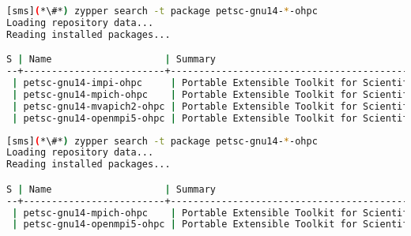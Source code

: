 \begin{lstlisting}[language=bash,keepspaces=true,keywords={}]
[sms](*\#*) zypper search -t package petsc-gnu14-*-ohpc
Loading repository data...
Reading installed packages...

S | Name                    | Summary
--+-------------------------+--------------------------------------------------------+--------
 | petsc-gnu14-impi-ohpc     | Portable Extensible Toolkit for Scientific Computation | package
 | petsc-gnu14-mpich-ohpc    | Portable Extensible Toolkit for Scientific Computation | package
 | petsc-gnu14-mvapich2-ohpc | Portable Extensible Toolkit for Scientific Computation | package
 | petsc-gnu14-openmpi5-ohpc | Portable Extensible Toolkit for Scientific Computation | package
\end{lstlisting}
\fi

\begin{lstlisting}[language=bash,keepspaces=true,keywords={}]
[sms](*\#*) zypper search -t package petsc-gnu14-*-ohpc
Loading repository data...
Reading installed packages...

S | Name                    | Summary
--+-------------------------+--------------------------------------------------------+--------
 | petsc-gnu14-mpich-ohpc    | Portable Extensible Toolkit for Scientific Computation | package
 | petsc-gnu14-openmpi5-ohpc | Portable Extensible Toolkit for Scientific Computation | package
\end{lstlisting}
\fi



